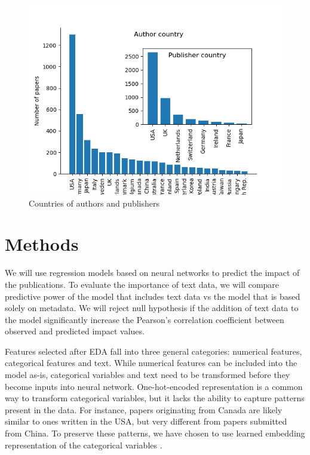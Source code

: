 \documentclass[11pt]{article}
\begin{document}
\begin{figure}
	\includegraphics[width= \columnwidth]{./Images/Countries.png}
	\caption{Countries of authors and publishers}
	\label{fig:countries}
\end{figure}

\section{Methods}
We will use regression models based on neural networks to predict the impact of the publications. To evaluate the importance of text data, we will compare predictive power of the model that includes text data vs the model that is based solely on metadata. We will reject null hypothesis if the addition of text data to the model significantly increase the Pearson's correlation coefficient between observed and predicted impact values.

Features selected after EDA fall into three general categories: numerical features, categorical features and text. While numerical features can be included into the model as-is, categorical variables and text need to be transformed before they become inputs into neural network. One-hot-encoded representation is a common way to transform categorical variables, but it lacks the ability to capture patterns present in the data. For instance, papers originating from Canada are likely similar to ones written in the USA, but very different from papers submitted from China. To preserve these patterns, we have chosen to use learned embedding representation of the categorical variables \citep{DBLP:journals/corr/GuoB16}.
\end{document}
